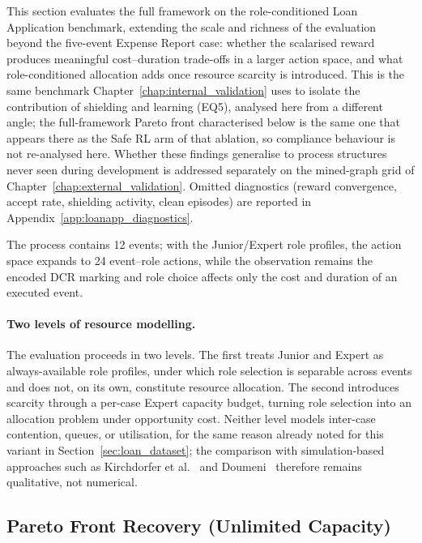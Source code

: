 This section evaluates the full framework on the role-conditioned Loan
Application benchmark, extending the scale and richness of the
evaluation beyond the five-event Expense Report case: whether the
scalarised reward produces meaningful cost--duration trade-offs in a
larger action space, and what role-conditioned allocation adds once
resource scarcity is introduced. This is the same benchmark
Chapter~\ref{chap:internal_validation} uses to isolate the
contribution of shielding and learning (EQ5), analysed here from a
different angle; the full-framework Pareto front characterised below
is the same one that appears there as the Safe \ac{RL} arm of that
ablation, so compliance behaviour is not re-analysed here. Whether
these findings generalise to process structures never seen during
development is addressed separately on the mined-graph grid of
Chapter~\ref{chap:external_validation}. Omitted diagnostics (reward
convergence, accept rate, shielding activity, clean episodes) are
reported in Appendix~\ref{app:loanapp_diagnostics}.

The process contains 12 events; with the Junior/Expert role profiles,
the action space expands to 24 event--role actions, while the
observation remains the encoded \ac{DCR} marking and role choice
affects only the cost and duration of an executed event.

\paragraph{Two levels of resource modelling.}
The evaluation proceeds in two levels. The first treats Junior and
Expert as always-available role profiles, under which role selection
is separable across events and does not, on its own, constitute
resource allocation. The second introduces scarcity through a per-case
Expert capacity budget, turning role selection into an allocation
problem under opportunity cost. Neither level models inter-case
contention, queues, or utilisation, for the same reason already noted
for this variant in Section~\ref{sec:loan_dataset}; the comparison with
simulation-based approaches such as Kirchdorfer et
al.~\cite{KirchdorferLukasFromPolicies} and
Doumeni~\cite{ArtemisDoumeniParetoAgentSimulator} therefore remains
qualitative, not numerical.

\subsection{Pareto Front Recovery (Unlimited Capacity)}
\label{sec:loanapp_pareto}

